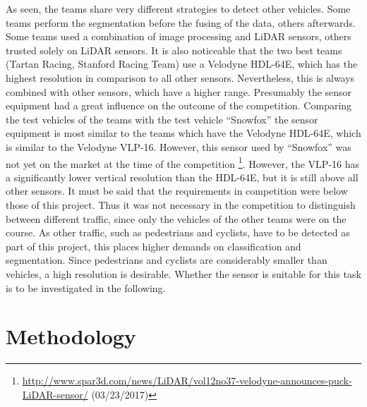 \documentclass[11pt,oneside,openright]{mpreport}
\begin{document}
As seen, the teams share very different strategies to detect other vehicles. Some teams perform the segmentation before the fusing of the data, others afterwards.
Some teams used a combination of image processing and LiDAR sensors, others trusted solely on LiDAR sensors. 
It is also noticeable that the two best teams (Tartan Racing, Stanford Racing Team) use a Velodyne HDL-64E,
which has the highest resolution in comparison to all other sensors. Nevertheless, this is always combined with other sensors, which have a higher range. 
Presumably the sensor equipment had a great influence on the outcome of the competition. Comparing the test vehicles of the teams with the test vehicle ``Snowfox'' the sensor equipment
is most similar to the teams which have the Velodyne HDL-64E, which is similar to the Velodyne VLP-16.
However, this sensor used by ``Snowfox'' was not yet on the market at the time of the competition \footnote{\url{http://www.spar3d.com/news/LiDAR/vol12no37-velodyne-announces-puck-LiDAR-sensor/}
(03/23/2017)}. However, the VLP-16 has a significantly lower vertical resolution than the HDL-64E, but it is still above all other sensors.
It must be said that the requirements in competition were below those of this project. Thus it was not necessary in the competition to distinguish between 
different traffic, since only the vehicles of the other teams were on the course. As other traffic, such as pedestrians and cyclists, have to be detected as part of this project, this places higher demands on classification and segmentation. Since pedestrians and cyclists are considerably smaller than vehicles, a high resolution is desirable. Whether the sensor is suitable for this task is to be investigated in the following.





\chapter{Methodology}
\end{document}
